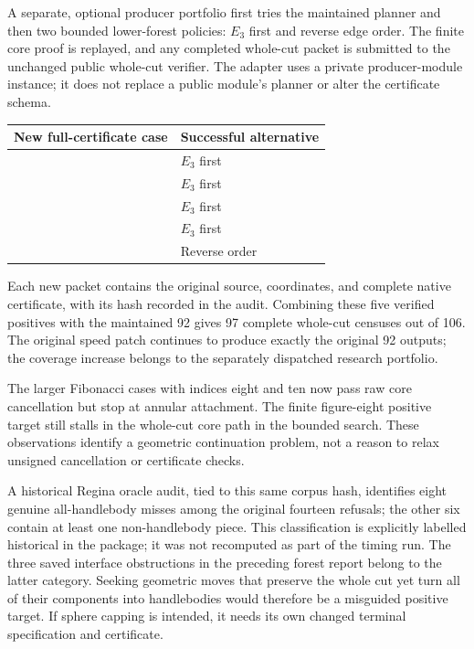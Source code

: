 A separate, optional producer portfolio first tries the maintained
planner and then two bounded lower-forest policies: $E_3$ first and reverse
edge order.  The finite core proof is replayed, and any completed whole-cut
packet is submitted to the unchanged public whole-cut verifier.  The adapter
uses a private producer-module instance; it does not replace a public
module's planner or alter the certificate schema.

\begin{center}
\begin{tabular}{P{0.57\textwidth}P{0.31\textwidth}}
\toprule
New full-certificate case & Successful alternative\\
\midrule
{} & $E_3$ first\\
 & $E_3$ first\\
 & $E_3$ first\\
 & $E_3$ first\\
 & Reverse order\\
\bottomrule
\end{tabular}
\end{center}

Each new packet contains the original source, coordinates, and complete
native certificate, with its hash recorded in the audit.  Combining these
five verified positives with the maintained 92 gives 97 complete whole-cut
censuses out of 106.  The original speed patch continues to produce exactly
the original 92 outputs; the coverage increase belongs to the separately
dispatched research portfolio.

The larger Fibonacci cases with indices eight and ten now pass raw core
cancellation but stop at annular attachment.  The finite figure-eight
positive target still stalls in the whole-cut core path in the bounded
search.  These observations identify a geometric continuation problem,
not a reason to relax unsigned cancellation or certificate checks.

A historical Regina oracle audit, tied to this same corpus hash, identifies
eight genuine all-handlebody misses among the original fourteen refusals;
the other six contain at least one non-handlebody piece.  This classification
is explicitly labelled historical in the package; it was not recomputed
as part of the timing run.  The three saved interface obstructions in the
preceding forest report belong to the latter category.  Seeking geometric
moves that preserve the whole cut yet turn all of their components into
handlebodies would therefore be a misguided positive target.  If sphere
capping is intended, it needs its own changed terminal specification and
certificate.

